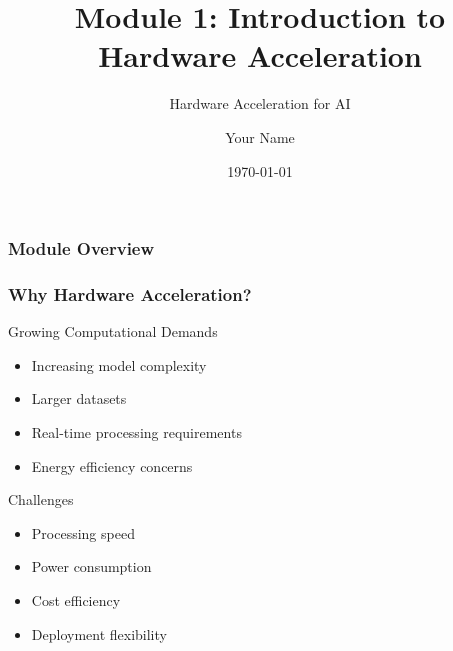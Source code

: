 \documentclass{beamer}
\title{Module 1: Introduction to Hardware Acceleration}
\subtitle{Hardware Acceleration for AI}
\author{Your Name}
\institute{Your Institution}
\date{\today}
\begin{document}
\begin{frame}
    \titlepage
\end{frame}

\begin{frame}
    \frametitle{Module Overview}
    \tableofcontents[hideallsubsections]
\end{frame}

\begin{frame}
    \frametitle{Why Hardware Acceleration?}
    \begin{block}{Growing Computational Demands}
        \begin{itemize}
            \item Increasing model complexity
            \item Larger datasets
            \item Real-time processing requirements
            \item Energy efficiency concerns
        \end{itemize}
    \end{block}
    
    \begin{alertblock}{Challenges}
        \begin{itemize}
            \item Processing speed
            \item Power consumption
            \item Cost efficiency
            \item Deployment flexibility
        \end{itemize}
    \end{alertblock}
\end{frame}
\end{document}

